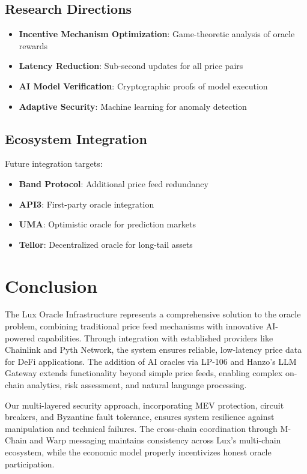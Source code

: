 \documentclass[11pt]{article}
\begin{document}
\subsection{Research Directions}

\begin{itemize}
    \item \textbf{Incentive Mechanism Optimization}: Game-theoretic analysis of oracle rewards
    \item \textbf{Latency Reduction}: Sub-second updates for all price pairs
    \item \textbf{AI Model Verification}: Cryptographic proofs of model execution
    \item \textbf{Adaptive Security}: Machine learning for anomaly detection
\end{itemize}

\subsection{Ecosystem Integration}

Future integration targets:

\begin{itemize}
    \item \textbf{Band Protocol}: Additional price feed redundancy
    \item \textbf{API3}: First-party oracle integration
    \item \textbf{UMA}: Optimistic oracle for prediction markets
    \item \textbf{Tellor}: Decentralized oracle for long-tail assets
\end{itemize}

\section{Conclusion}

The Lux Oracle Infrastructure represents a comprehensive solution to the oracle problem, combining traditional price feed mechanisms with innovative AI-powered capabilities. Through integration with established providers like Chainlink and Pyth Network, the system ensures reliable, low-latency price data for DeFi applications. The addition of AI oracles via LP-106 and Hanzo's LLM Gateway extends functionality beyond simple price feeds, enabling complex on-chain analytics, risk assessment, and natural language processing.

Our multi-layered security approach, incorporating MEV protection, circuit breakers, and Byzantine fault tolerance, ensures system resilience against manipulation and technical failures. The cross-chain coordination through M-Chain and Warp messaging maintains consistency across Lux's multi-chain ecosystem, while the economic model properly incentivizes honest oracle participation.
\end{document}
